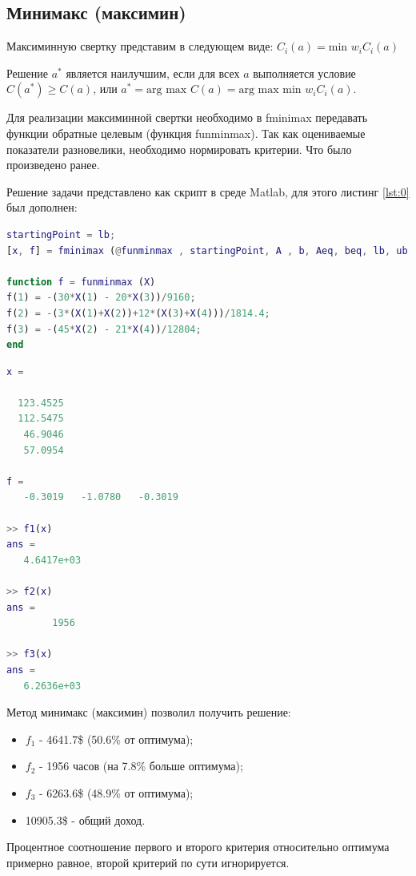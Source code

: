 \subsection{Минимакс (максимин)}
Максиминную свертку представим в следующем виде: $C_i(a)= \text{min } w_i C_i(a)$

Решение $a^*$ является наилучшим, если для всех $a$ выполняется условие $C(a^*) \geq C(a)$, или $a^* = \text{arg max } C(a) = \text{arg max min } w_i C_i (a)$.

Для реализации максиминной свертки необходимо в fminimax передавать функции обратные целевым (функция funminmax). Так как оцениваемые показатели разновелики, необходимо нормировать критерии. Что было произведено ранее.

Решение задачи представлено как скрипт в среде Matlab, для этого листинг \ref{lst:0} был дополнен:
\begin{lstlisting}[language={matlab}, caption={Минимакс (максимин)}, label={lst:minmax}]
%Минимакс - максимин
startingPoint = lb;
[x, f] = fminimax (@funminmax , startingPoint, A , b, Aeq, beq, lb, ub )

function f = funminmax (X)
f(1) = -(30*X(1) - 20*X(3))/9160;
f(2) = -(3*(X(1)+X(2))+12*(X(3)+X(4)))/1814.4;
f(3) = -(45*X(2) - 21*X(4))/12804;
end
\end{lstlisting}
\begin{lstlisting}[language={matlab}, caption={Результаты выполнения листинга \ref{lst:minmax}}]
x =

  123.4525
  112.5475
   46.9046
   57.0954

f =
   -0.3019   -1.0780   -0.3019

>> f1(x)
ans =
   4.6417e+03

>> f2(x)
ans =
        1956

>> f3(x)
ans =
   6.2636e+03
\end{lstlisting}
Метод минимакс (максимин) позволил получить решение:
\begin{itemize}
\item $f_1$ - 4641.7\$ (50.6\% от оптимума);
\item $f_2$ - 1956 часов (на 7.8\% больше оптимума);
\item $f_3$ - 6263.6\$ (48.9\% от оптимума);
\item 10905.3\$ - общий доход.
\end{itemize}
Процентное соотношение первого и второго критерия относительно оптимума примерно равное, второй критерий по сути игнорируется.

